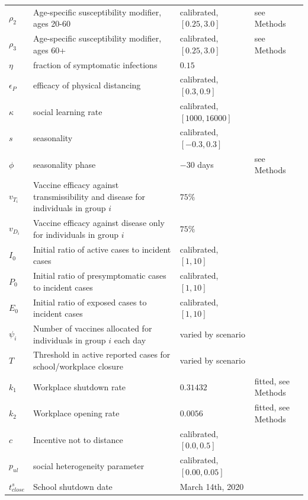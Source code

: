 \begin{table}[H]
\begin{tabular}{l p{5.5cm} l l}
  $\rho_2$ & Age-specific susceptibility modifier, ages 20-60 & calibrated, $[0.25,3.0]$  & see Methods\\
  $\rho_3$ & Age-specific susceptibility modifier, ages 60+ & calibrated, $[0.25,3.0]$  & see Methods\\
  $\eta$ & fraction of symptomatic infections & $0.15$ & \cite{mizumoto2020estimating} \\
  $\epsilon_P$ & efficacy of physical distancing  & calibrated, $[0.3,0.9]$ & \cite{googlemobility, ontariocoviddata}  \\
  $\kappa$    & social learning rate   & calibrated, $[1000,16000]$ & \cite{googlemobility, ontariocoviddata} \\
  $ s $ & seasonality & calibrated, $[-0.3,0.3]$ & \cite{googlemobility, ontariocoviddata} \\
  $\phi$  & seasonality phase & $-30$ days & see Methods \\
  $ v_{T_i} $ & Vaccine efficacy against transmissibility and disease for individuals in group $i$  &  $75 \%$  & \cite{WHO_TPP} \\
  $ v_{D_i} $ & Vaccine efficacy against disease only for individuals in group $i$  &  $75 \%$  & \cite{WHO_TPP} \\
  $ I_0 $ & Initial ratio of active cases to incident cases & calibrated, $[1,10]$ & \cite{googlemobility, ontariocoviddata} \\
  $ P_0 $ & Initial ratio of presymptomatic cases to incident cases & calibrated, $[1,10]$ & \\
  $ E_0 $ & Initial ratio of exposed cases to incident cases & calibrated, $[1,10]$ & \\
  $\psi_i$ & Number of vaccines allocated for individuals in group $i$ each day & varied by scenario &  \\
  $T$ & Threshold in active reported cases for school/workplace closure & varied by scenario  &  \\
  $ k_1 $ & Workplace shutdown rate & $ 0.31432$ & fitted, see Methods \\
  $ k_2 $ & Workplace opening rate & $ 0.0056$ & fitted, see Methods \\
  $ c $ & Incentive not to distance & calibrated,$[0.0,0.5]$ & \cite{googlemobility, ontariocoviddata} \\
  $ p_{ul} $ & social heterogeneity parameter & calibrated, $[0.00,0.05]$ & \cite{googlemobility, ontariocoviddata}  \\
  $ t^s_{close} $ &  School shutdown date & March 14th, 2020 & \cite{school_closure}\\

\end{tabular}
\end{table}

